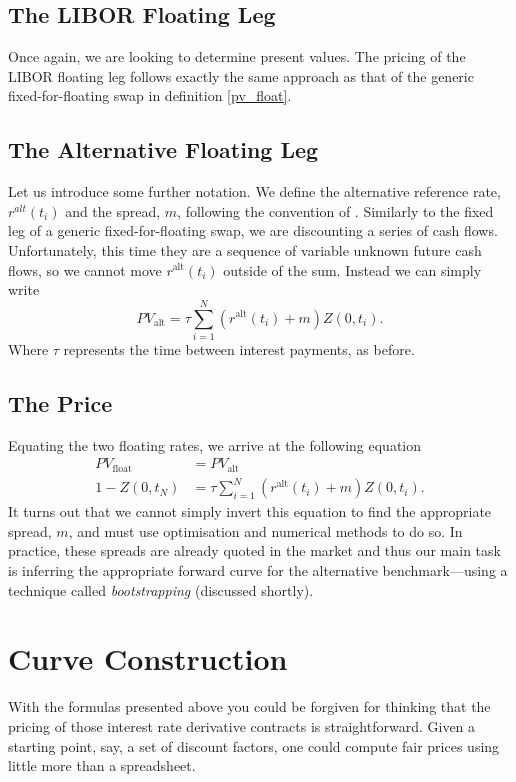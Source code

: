 \subsection{The LIBOR Floating Leg}
Once again, we are looking to determine present values. The pricing of the LIBOR floating leg follows exactly the same approach as that of the generic fixed-for-floating swap in definition \ref{pv_float}.

\subsection{The Alternative Floating Leg}
Let us introduce some further notation. We define the alternative reference rate, $r^{alt}(t_i)$ and the spread, $m$, following the convention of \cite{flavell2012swaps}. Similarly to the fixed leg of a generic fixed-for-floating swap, we are discounting a series of cash flows. Unfortunately, this time they are a sequence of variable unknown future cash flows, so we cannot move $r^{\text{alt}}(t_i)$ outside of the sum. Instead we can simply write
\begin{equation}
    PV_{\text{alt}} = \tau \sum_{i=1}^{N} \left( r^{\text{alt}}(t_i) + m \right) Z(0,t_i).
\end{equation}
Where $\tau$ represents the time between interest payments, as before.

\subsection{The Price}
Equating the two floating rates, we arrive at the following equation
\begin{align}
    PV_{\text{float}} &= PV_{\text{alt}} \\
    1 - Z(0,t_N) &= \tau \sum_{i=1}^{N} \left( r^{\text{alt}}(t_i) + m \right) Z(0,t_i).
\end{align}
It turns out that we cannot simply invert this equation to find the appropriate spread, $m$, and must use optimisation and numerical methods to do so. In practice, these spreads are already quoted in the market and thus our main task is inferring the appropriate forward curve for the alternative benchmark––using a technique called \textit{bootstrapping} (discussed shortly).

\section{Curve Construction}
With the formulas presented above you could be forgiven for thinking that the pricing of those interest rate derivative contracts is straightforward. Given a starting point, say, a set of discount factors, one could compute fair prices using little more than a spreadsheet. 

